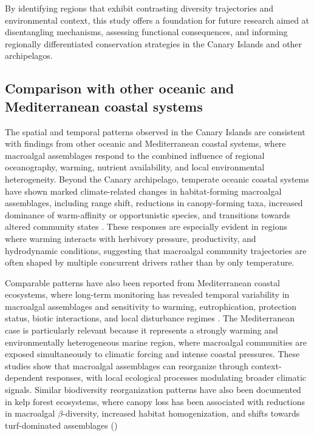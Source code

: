 \documentclass[a4paper,fleqn]{cas-sc}
\begin{document}
By identifying regions that exhibit contrasting diversity trajectories and environmental context, this study offers a foundation for future research aimed at disentangling mechanisms, assessing functional consequences, and informing regionally differentiated conservation strategies in the Canary Islands and other archipelagos.

\subsection{Comparison with other oceanic and Mediterranean coastal systems}

The spatial and temporal patterns observed in the Canary Islands are consistent with findings from other oceanic and Mediterranean coastal systems, where macroalgal assemblages respond to the combined influence of regional oceanography, warming, nutrient availability, and local environmental heterogeneity. Beyond the Canary archipelago, temperate oceanic coastal systems have shown marked climate-related changes in habitat-forming macroalgal assemblages, including range shift, reductions in canopy-forming taxa, increased dominance of warm-affinity or opportunistic species, and transitions towards altered community states \citep{Vergesetal2016, Wernbergetal2016}. These responses are especially evident in regions where warming interacts with herbivory pressure, productivity, and hydrodynamic conditions, suggesting that macroalgal community trajectories are often shaped by multiple concurrent drivers rather than by only temperature.

Comparable patterns have also been reported from Mediterranean coastal ecosystems, where long-term monitoring has revealed temporal variability in macroalgal assemblages and sensitivity to warming, eutrophication, protection status, biotic interactions, and local disturbance regimes \citep{Medrano2019Long-term, RILOV2020105045}. The Mediterranean case is particularly relevant because it represents a strongly warming and environmentally heterogeneous marine region, where macroalgal communities are exposed simultaneously to climatic forcing and intense coastal pressures. These studies show that macroalgal assemblages can reorganize through context-dependent responses, with local ecological processes modulating broader climatic signals. Similar biodiversity reorganization patterns have also been documented in kelp forest ecosystems, where canopy loss has been associated with reductions in macroalgal $ \beta$-diversity, increased habitat homogenization, and shifts towards turf-dominated assemblages (\cite{PineiroEtAl2024BetaDiversity, FarrellEtAl2026FunctionalDiversity})
\end{document}
